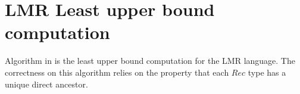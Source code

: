 

\section{LMR Least upper bound computation}

Algorithm in  is the least upper bound computation for the LMR language. 
The correctness on this algorithm relies on the property that each $\mathit{Rec}$ type has a unique direct ancestor. 

